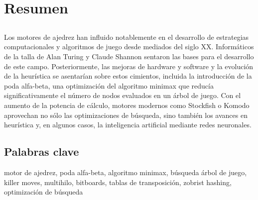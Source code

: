 \chapter*{Resumen}

\section*{\tituloPortadaVal}

Los motores de ajedrez han influido notablemente en el desarrollo de estrategias computacionales y algoritmos de juego desde mediados del siglo XX. Informáticos de la talla de Alan Turing y Claude Shannon sentaron las bases para el desarrollo de este campo. Posteriormente, las mejoras de hardware y software y la evolución de la heurística se asentarían sobre estos cimientos, incluida la introducción de la poda alfa-beta, una optimización del algoritmo minimax que reducía significativamente el número de nodos evaluados en un árbol de juego. Con el aumento de la potencia de cálculo, motores modernos como Stockfish o Komodo aprovechan no sólo las optimizaciones de búsqueda, sino también los avances en heurística y, en algunos casos, la inteligencia artificial mediante redes neuronales.

\section*{Palabras clave}
   
\noindent motor de ajedrez, poda alfa-beta, algoritmo minimax, búsqueda árbol de juego, killer moves, multihilo, bitboards, tablas de transposición, zobrist hashing, optimización de búsqueda

   


